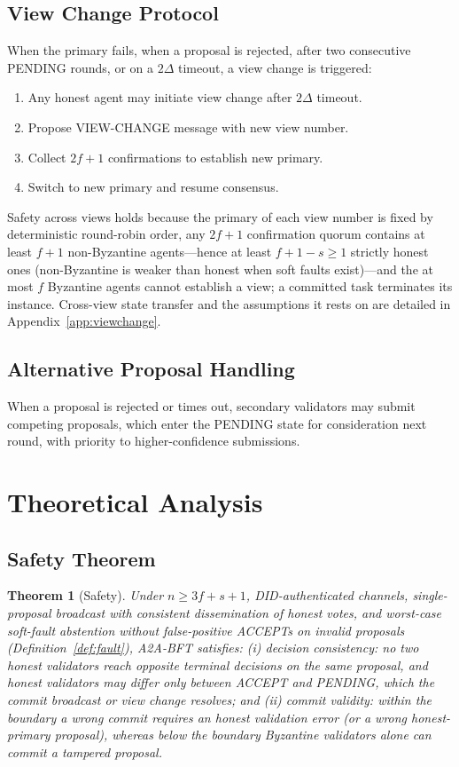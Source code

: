 \documentclass{article}
\newtheorem{theorem}{Theorem}[section]
\begin{document}
\subsection{View Change Protocol}

When the primary fails, when a proposal is rejected, after two consecutive PENDING rounds, or on a $2\Delta$ timeout, a view change is triggered:
\begin{enumerate}
    \item Any honest agent may initiate view change after $2\Delta$ timeout.
    \item Propose VIEW-CHANGE message with new view number.
    \item Collect $2f+1$ confirmations to establish new primary.
    \item Switch to new primary and resume consensus.
\end{enumerate}
Safety across views holds because the primary of each view number is fixed by deterministic round-robin order, any $2f{+}1$ confirmation quorum contains at least $f{+}1$ non-Byzantine agents---hence at least $f{+}1{-}s \geq 1$ strictly honest ones (non-Byzantine is weaker than honest when soft faults exist)---and the at most $f$ Byzantine agents cannot establish a view; a committed task terminates its instance. Cross-view state transfer and the assumptions it rests on are detailed in Appendix~\ref{app:viewchange}.

\subsection{Alternative Proposal Handling}\label{sec:altprop}

When a proposal is rejected or times out, secondary validators may submit competing proposals, which enter the PENDING state for consideration next round, with priority to higher-confidence submissions.

\section{Theoretical Analysis}
\label{sec:theory}

\subsection{Safety Theorem}

\begin{theorem}[Safety]
\label{thm:safety}
Under $n \geq 3f + s + 1$, DID-authenticated channels, single-proposal broadcast with consistent dissemination of honest votes, and worst-case soft-fault abstention without false-positive ACCEPTs on invalid proposals (Definition~\ref{def:fault}), A2A-BFT satisfies: (i) \emph{decision consistency}: no two honest validators reach \emph{opposite} terminal decisions on the same proposal, and honest validators may differ only between ACCEPT and PENDING, which the commit broadcast or view change resolves; and (ii) \emph{commit validity}: within the boundary a wrong commit requires an honest validation error (or a wrong honest-primary proposal), whereas below the boundary Byzantine validators alone can commit a tampered proposal.
\end{theorem}
\end{document}
